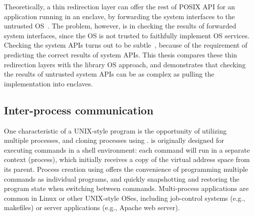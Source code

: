 Theoretically, a thin redirection layer can offer the rest of POSIX API for an application running in an enclave,
by forwarding the system interfaces to the untrusted OS~\cite{osdi16scone,shinde17panoply}.
The problem, however, is in checking the results of forwarded system interfaces, since the OS is not trusted to faithfully implement OS services.
Checking the system APIs turns out to be subtle~\cite{checkoway13iago},
because of the requirement of predicting the correct results of system APIs.
This thesis compares these thin redirection layers
with the library OS approach,
and demonstrates that checking the results of untrusted system APIs
can be as complex as 
pulling the implementation into enclaves.







\subsection{Inter-process communication}


One characteristic of a UNIX-style program is the opportunity of utilizing multiple processes, and cloning processes using .
 is originally designed for executing commands in a shell environment:
each command will run in a separate context (process), which initially receives a copy of the virtual address space from its parent.
Process creation using  offers the convenience of programming multiple commands as individual programs,
and quickly snapshotting and restoring the program state
when switching between commands.
Multi-process applications are common
in Linux or other UNIX-style OSes, including job-control systems (e.g., makefiles) or server applications (e.g., Apache web server).


